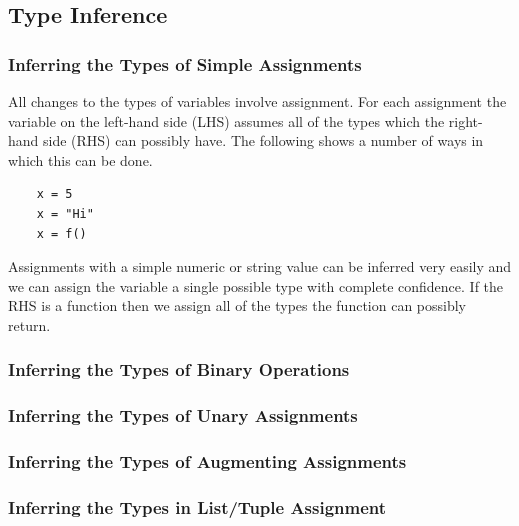 \documentclass[12pt, titlepage]{article}
\begin{document}
\subsection{Type Inference}




\subsubsection{Inferring the Types of Simple Assignments}
All changes to the types of variables involve assignment. For each assignment the variable on the left-hand side (LHS) assumes all of the types which the right-hand side (RHS) can possibly have. The following shows a number of ways in which this can be done.
\begin{lstlisting}
	x = 5
	x = "Hi"
	x = f()
\end{lstlisting}
Assignments with a simple numeric or string value can be inferred very easily and we can assign the variable a single possible type with complete confidence. If the RHS is a function then we assign all of the types the function can possibly return.

\subsubsection{Inferring the Types of Binary Operations}

\subsubsection{Inferring the Types of Unary Assignments}

\subsubsection{Inferring the Types of Augmenting Assignments}

\subsubsection{Inferring the Types in List/Tuple Assignment}
\end{document}
